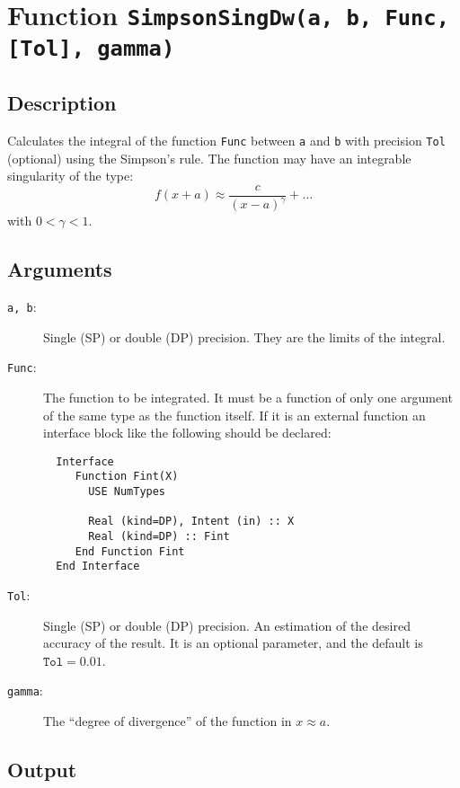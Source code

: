 \section{Function \texttt{SimpsonSingDw(a, b, Func, [Tol], gamma)}}

\subsection{Description}

Calculates the integral of the function \texttt{Func} between
\texttt{a} and \texttt{b} with precision \texttt{Tol} (optional) using
the Simpson's rule. The function may have an integrable singularity of
the type:
\begin{displaymath}
  f(x+a) \approx \frac{c}{(x-a)^\gamma} +  \dots
\end{displaymath}
with $0<\gamma<1$.

\subsection{Arguments}

\begin{description}
\item[\texttt{a, b}:] Single (SP) or double (DP) precision. They are
  the limits of the integral.
\item[\texttt{Func}:] The function to be integrated. It must be a
  function of only one argument of the same type as the function
  itself. If it is an
  external function an interface block like the following should be
  declared: 
\begin{verbatim}
  Interface 
     Function Fint(X)
       USE NumTypes

       Real (kind=DP), Intent (in) :: X
       Real (kind=DP) :: Fint
     End Function Fint
  End Interface
\end{verbatim}
\item[\texttt{Tol}:] Single (SP) or double (DP) precision. An
  estimation of the desired accuracy of the result. It is an optional
  parameter, and the default is $\mathtt{Tol} = 0.01$. 
\item[\texttt{gamma}:] The ``degree of divergence'' of the function in
  $x\approx a$. 
\end{description}


\subsection{Output}

